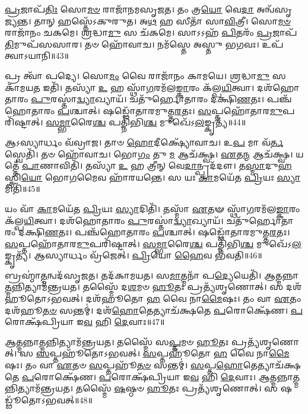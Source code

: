 \-\ul{𑌪𑍍𑌰}\-𑌜𑌾\-𑌪᳴\-\ul{𑌤𑌿𑌃} 𑌸𑍋\-\ul{𑌮}\-\-\ul{𑍞} 𑌰𑌾𑌜𑌾᳴𑌨𑌮\-𑌸𑍃𑌜𑌤।
𑌤𑌂 𑌤𑍍𑌰\-\ul{𑌯𑍋} 𑌵𑍇\-\ul{𑌦𑌾} 𑌅𑌨𑍍𑌵᳴𑌸𑍃𑌜𑍍𑌯𑌨𑍍𑌤।
𑌤𑌾𑌨𑍍 𑌹𑌸𑍍𑌤𑍇᳴\-𑌽𑌕𑍁𑌰𑍁𑌤।
𑌅\-\ul{𑌥} 𑌹 𑌸𑍀𑌤𑌾᳴ 𑌸𑌾\-\ul{𑌵𑌿}\-𑌤𑍍𑌰𑍀।
𑌸𑍋\-\ul{𑌮}\-\-\ul{𑍞} 𑌰𑌾𑌜𑌾᳴𑌨𑌂 𑌚𑌕𑌮𑍇।
\-\ul{𑌶𑍍𑌰}\-𑌦𑍍𑌧𑌾\-\ul{𑌮𑍁} 𑌸 𑌚᳴𑌕𑌮𑍇।
𑌸𑌾𑌽𑌽𑌹᳴ \ul{𑌪𑌿}\-𑌤𑌰𑌂᳴ \ul{𑌪𑍍𑌰}\-𑌜𑌾𑌪᳴\-\ul{𑌤𑌿}\-𑌮𑍁𑌪᳴𑌸𑌸𑌾𑌰।
𑌤𑍞 𑌹𑍋᳴𑌵𑌾𑌚।
𑌨𑌮᳴𑌸𑍍𑌤𑍇 𑌅𑌸𑍍𑌤𑍁 𑌭𑌗𑌵𑌃।
𑌉𑌪᳴ 𑌤𑍍𑌵𑌾\-𑌽𑌯𑌾𑌨𑌿॥43॥

𑌪𑍍𑌰 𑌤𑍍𑌵𑌾᳴ 𑌪𑌦𑍍𑌯𑍇।
𑌸𑍋\-\ul{𑌮𑌂} 𑌵𑍈 𑌰𑌾𑌜𑌾᳴𑌨𑌂 𑌕𑌾𑌮𑌯𑍇।
\-\ul{𑌶𑍍𑌰}\-𑌦𑍍𑌧𑌾\-\ul{𑌮𑍁} 𑌸 𑌕𑌾᳴𑌮𑌯\-\ul{𑌤} 𑌇𑌤𑌿᳴।
𑌤𑌸𑍍𑌯𑌾᳴ \ul{𑌉} 𑌹 𑌸𑍍𑌥𑌾᳴\-\ul{𑌗}\-𑌰𑌮᳴𑌲\-\ul{𑌙𑍍𑌕𑌾}\-𑌰𑌂 𑌕᳴𑌲𑍍𑌪\-\ul{𑌯𑌿}\-𑌤𑍍𑌵𑌾।
𑌦𑌶᳴𑌹𑍋𑌤𑌾𑌰𑌂 \ul{𑌪𑍁}\-𑌰𑌸𑍍𑌤𑌾॑\-\ul{𑌦𑍍𑌵𑍍𑌯𑌾}\-𑌖𑍍𑌯𑌾𑌯᳴।
𑌚𑌤𑍁᳴𑌰𑍍\mbox{}𑌹𑍋𑌤𑌾𑌰𑌂 𑌦𑌕𑍍𑌷𑌿\-\ul{𑌣}\-𑌤𑌃।
𑌪𑌞𑍍𑌚᳴𑌹𑍋𑌤𑌾𑌰𑌂 \ul{𑌪}\-𑌶𑍍𑌚𑌾𑌤𑍍।
𑌷𑌡𑍍𑌢𑍋᳴𑌤𑌾𑌰𑌮𑍁𑌤𑍍𑌤\-\ul{𑌰}\-𑌤𑌃।
\-\ul{𑌸}\-𑌪𑍍𑌤𑌹𑍋᳴𑌤𑌾𑌰\-\ul{𑌮𑍁}\-𑌪𑌰𑌿᳴𑌷𑍍𑌟𑌾𑌤𑍍।
\-\ul{𑌸}\-\-\ul{𑌮𑍍𑌭𑌾}\-𑌰𑍈\-\ul{𑌶𑍍𑌚} 𑌪𑌤𑍍𑌨𑌿᳴𑌭𑌿\-\ul{𑌶𑍍𑌚} 𑌮𑍁𑌖𑍇᳴\-𑌽\-\ul{𑌲}\-𑌙𑍍𑌕𑍃𑌤𑍍𑌯᳴॥44॥

𑌆𑌽𑌸𑍍𑌯𑌾𑌰𑍍𑌧𑌂 𑌵᳴𑌵𑍍𑌰𑌾𑌜।
𑌤𑌾𑍞 \ul{𑌹𑍋}\-𑌦𑍀𑌕𑍍𑌷𑍍𑌯𑍋᳴𑌵𑌾𑌚।
𑌉\-\ul{𑌪} 𑌮𑌾 𑌵᳴\-\ul{𑌰𑍍𑌤}\-𑌸𑍍𑌵𑍇𑌤𑌿᳴।
𑌤𑍞 𑌹𑍋᳴𑌵𑌾𑌚।
𑌭𑍋\-\ul{𑌗𑌂} 𑌤𑍁 \ul{𑌮} 𑌆𑌚᳴𑌕𑍍𑌷𑍍𑌵।
\-\ul{𑌏}\-𑌤\-\ul{𑌨𑍍𑌮} 𑌆𑌚᳴𑌕𑍍𑌷𑍍𑌵।
𑌯𑌤𑍍𑌤𑍇᳴ \ul{𑌪𑌾}\-𑌣𑌾𑌵𑌿𑌤𑌿᳴।
𑌤𑌸𑍍𑌯𑌾᳴ \ul{𑌉} 𑌹 𑌤𑍍𑌰𑍀𑌨𑍍 𑌵𑍇\-\ul{𑌦𑌾}\-𑌨𑍍𑌪𑍍𑌰𑌦᳴𑌦𑍗।
𑌤\-\ul{𑌸𑍍𑌮𑌾}\-𑌦𑍁\-\ul{𑌹} 𑌸𑍍𑌤𑍍𑌰𑌿\-\ul{𑌯𑍋} 𑌭𑍋\-\ul{𑌗}\-𑌮𑍈𑌵 𑌹𑌾᳴𑌰𑌯𑌨𑍍𑌤𑍇।
𑌸 𑌯𑌃 \ul{𑌕𑌾}\-𑌮𑌯𑍇᳴𑌤 \ul{𑌪𑍍𑌰𑌿}\-𑌯𑌃 \ul{𑌸𑍍𑌯𑌾}\-𑌮𑌿𑌤𑌿᳴॥45॥

𑌯𑌂 𑌵𑌾᳴ \ul{𑌕𑌾}\-𑌮𑌯𑍇᳴𑌤 \ul{𑌪𑍍𑌰𑌿}\-𑌯𑌃 \ul{𑌸𑍍𑌯𑌾}\-𑌦𑌿𑌤𑌿᳴।
𑌤𑌸𑍍𑌮𑌾᳴ \ul{𑌏}\-𑌤𑍟 𑌸𑍍𑌥𑌾᳴\-\ul{𑌗}\-𑌰𑌮᳴𑌲\-\ul{𑌙𑍍𑌕𑌾}\-𑌰𑌂 𑌕᳴𑌲𑍍𑌪\-\ul{𑌯𑌿}\-𑌤𑍍𑌵𑌾।
𑌦𑌶᳴𑌹𑍋𑌤𑌾𑌰𑌂 \ul{𑌪𑍁}\-𑌰𑌸𑍍𑌤𑌾॑\-\ul{𑌦𑍍𑌵𑍍𑌯𑌾}\-𑌖𑍍𑌯𑌾𑌯᳴।
𑌚𑌤𑍁᳴𑌰𑍍\mbox{}𑌹𑍋𑌤𑌾𑌰𑌂 𑌦𑌕𑍍𑌷𑌿\-\ul{𑌣}\-𑌤𑌃।
𑌪𑌞𑍍𑌚᳴𑌹𑍋𑌤𑌾𑌰𑌂 \ul{𑌪}\-𑌶𑍍𑌚𑌾𑌤𑍍।
𑌷𑌡𑍍𑌢𑍋᳴𑌤𑌾𑌰𑌮𑍁𑌤𑍍𑌤\-\ul{𑌰}\-𑌤𑌃।
\-\ul{𑌸}\-𑌪𑍍𑌤𑌹𑍋᳴𑌤𑌾𑌰\-\ul{𑌮𑍁}\-𑌪𑌰𑌿᳴𑌷𑍍𑌟𑌾𑌤𑍍।
\-\ul{𑌸}\-\-\ul{𑌮𑍍𑌭𑌾}\-𑌰𑍈\-\ul{𑌶𑍍𑌚} 𑌪𑌤𑍍𑌨𑌿᳴𑌭𑌿\-\ul{𑌶𑍍𑌚} 𑌮𑍁𑌖𑍇᳴\-𑌽\-\ul{𑌲}\-𑌙𑍍𑌕𑍃𑌤𑍍𑌯᳴।
𑌆𑌸𑍍𑌯𑌾𑌰𑍍𑌧𑌂 𑌵𑍍𑌰᳴𑌜𑍇𑌤𑍍।
\-\ul{𑌪𑍍𑌰𑌿}\-𑌯𑍋 \ul{𑌹𑍈}\-𑌵 𑌭᳴𑌵𑌤𑌿॥46॥\anuvakamend[\-\ul{𑌅}\-\-\ul{𑌯𑌾}\-\-\ul{𑌨𑍍𑌯}\-\-\ul{𑌲}\-𑌙𑍍𑌕𑍃𑌤𑍍𑌯᳴ \ul{𑌸𑍍𑌯𑌾}\-𑌮𑌿𑌤𑌿᳴ 𑌭𑌵𑌤𑌿]

𑌬𑍍𑌰𑌹𑍍𑌮𑌾॑\-\ul{𑌤𑍍𑌮}\-𑌨𑍍𑌵𑌦᳴\-𑌸𑍃𑌜𑌤।
𑌤𑌦᳴𑌕𑌾𑌮𑌯𑌤।
𑌸\-\ul{𑌮𑌾}\-𑌤𑍍𑌮𑌨𑌾᳴ 𑌪\-\ul{𑌦𑍍𑌯𑍇}\-𑌯𑍇𑌤𑌿᳴।
𑌆\-\ul{𑌤𑍍𑌮}\-𑌨𑍍𑌨𑌾\-\ul{𑌤𑍍𑌮}\-𑌨𑍍𑌨𑌿𑌤𑍍𑌯𑌾𑌮᳴𑌨𑍍𑌤𑍍𑌰𑌯𑌤।
𑌤𑌸𑍍𑌮𑍈᳴ 𑌦\-\ul{𑌶}\-𑌮𑍞 \ul{𑌹𑍂}\-𑌤𑌃 𑌪𑍍𑌰𑌤𑍍𑌯᳴𑌶𑍃𑌣𑍋𑌤𑍍।
𑌸 𑌦𑌶᳴𑌹𑍂𑌤𑍋\-𑌽𑌭𑌵𑌤𑍍।
𑌦𑌶᳴𑌹𑍂𑌤𑍋 \ul{𑌹} 𑌵𑍈 𑌨𑌾\-\ul{𑌮𑍈}\-𑌷𑌃।
𑌤𑌂 𑌵𑌾 \ul{𑌏}\-𑌤𑌂 𑌦𑌶᳴𑌹𑍂\-\ul{𑌤}\-\-\ul{𑍞} 𑌸𑌨𑍍𑌤𑌮𑍍॑।
𑌦𑌶᳴\-\ul{𑌹𑍋}\-𑌤𑍇𑌤𑍍𑌯𑌾𑌚᳴𑌕𑍍𑌷𑌤𑍇 \ul{𑌪}\-𑌰𑍋𑌕𑍍𑌷𑍇᳴𑌣।
\-\ul{𑌪}\-𑌰𑍋𑌕𑍍𑌷᳴𑌪𑍍𑌰𑌿𑌯𑌾 𑌇\-\ul{𑌵} 𑌹𑌿 \ul{𑌦𑍇}\-𑌵𑌾𑌃॥47॥

𑌆\-\ul{𑌤𑍍𑌮}\-𑌨𑍍𑌨𑌾\-\ul{𑌤𑍍𑌮}\-𑌨𑍍𑌨𑌿𑌤𑍍𑌯𑌾𑌮᳴𑌨𑍍𑌤𑍍𑌰𑌯𑌤।
𑌤𑌸𑍍𑌮𑍈᳴ 𑌸\-\ul{𑌪𑍍𑌤}\-𑌮𑍞 \ul{𑌹𑍂}\-𑌤𑌃 𑌪𑍍𑌰𑌤𑍍𑌯᳴𑌶𑍃𑌣𑍋𑌤𑍍।
𑌸 \ul{𑌸}\-𑌪𑍍𑌤𑌹𑍂᳴𑌤𑍋\-𑌽𑌭𑌵𑌤𑍍।
\-\ul{𑌸}\-𑌪𑍍𑌤𑌹𑍂᳴𑌤𑍋 \ul{𑌹} 𑌵𑍈 𑌨𑌾\-\ul{𑌮𑍈}\-𑌷𑌃।
𑌤𑌂 𑌵𑌾 \ul{𑌏}\-𑌤𑍞 \ul{𑌸}\-𑌪𑍍𑌤𑌹𑍂᳴\-\ul{𑌤}\-\-\ul{𑍞} 𑌸𑌨𑍍𑌤𑌮𑍍॑।
\-\ul{𑌸}\-𑌪𑍍𑌤\-\ul{𑌹𑍋}\-𑌤𑍇𑌤𑍍𑌯𑌾𑌚᳴𑌕𑍍𑌷𑌤𑍇 \ul{𑌪}\-𑌰𑍋𑌕𑍍𑌷𑍇᳴𑌣।
\-\ul{𑌪}\-𑌰𑍋𑌕𑍍𑌷᳴𑌪𑍍𑌰𑌿𑌯𑌾 𑌇\-\ul{𑌵} 𑌹𑌿 \ul{𑌦𑍇}\-𑌵𑌾𑌃।
𑌆\-\ul{𑌤𑍍𑌮}\-𑌨𑍍𑌨𑌾\-\ul{𑌤𑍍𑌮}\-𑌨𑍍𑌨𑌿𑌤𑍍𑌯𑌾𑌮᳴𑌨𑍍𑌤𑍍𑌰𑌯𑌤।
𑌤𑌸𑍍𑌮𑍈᳴ \ul{𑌷}\-𑌷𑍍𑌠𑍞 \ul{𑌹𑍂}\-𑌤𑌃 𑌪𑍍𑌰𑌤𑍍𑌯᳴𑌶𑍃𑌣𑍋𑌤𑍍।
𑌸 𑌷𑌡𑍍𑌢𑍂᳴𑌤𑍋\-𑌽𑌭𑌵𑌤𑍍॥48॥

